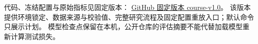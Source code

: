 代码、冻结配置与原始指标见固定版本：
\href{https://github.com/Higgsfield-DHY/optimization-course-muon/tree/course-v1.0}{GitHub 固定版本 course-v1.0}。
该版本提供环境锁定、数据来源与校验值、完整研究流程及固定配置重放入口；默认命令只展示计划。
模型检查点保留在本机，公开仓库的评估摘要不能代替加载模型重新计算测试损失。
